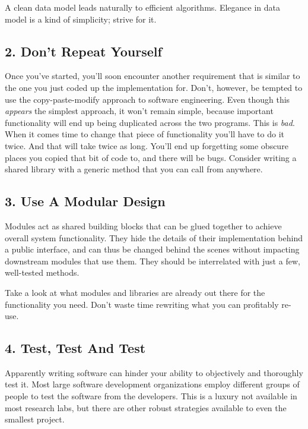 \documentclass{bmcart}
\begin{document}
A clean data model leads naturally to efficient algorithms. Elegance in data model is a kind of simplicity; strive for it. 

\subsection*{2. Don't Repeat Yourself}

Once you've started, you'll soon encounter another requirement that is similar to the one you just coded up the implementation for. Don't, however, be tempted to use the copy-paste-modify approach to software engineering. Even though this \textit{appears} the simplest approach, it won't remain simple, because important functionality will end up being duplicated across the two programs. This is \textit{bad}. When it comes time to change that piece of functionality you'll have to do it twice. And that will take twice as long. You'll end up forgetting some obscure places you copied that bit of code to, and there will be bugs. Consider writing a shared library with a generic method that you can call from anywhere.  

\subsection*{3. Use A Modular Design}

Modules act as shared building blocks that can be glued together to achieve overall system functionality. They hide the details of their implementation behind a public interface, and can thus be changed behind the scenes without impacting downstream modules that use them. They should be interrelated with just a few, well-tested methods. 

Take a look at what modules and libraries are already out there for the functionality you need. Don't waste time rewriting what you can profitably re-use.   

\subsection*{4. Test, Test And Test}

Apparently writing software can hinder your ability to objectively and thoroughly test it. Most large software development organizations employ different groups of people to test the software from the developers. This is a luxury not available in most research labs, but there are other robust strategies available to even the smallest project. 
\end{document}
